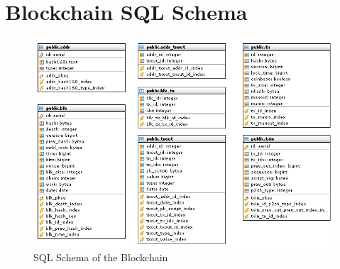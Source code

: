 \chapter{Blockchain SQL Schema} %
\label{AppendixA} %


\begin{figure}[ht]
\begin{center}
\includegraphics[width=\textwidth]{./Figures/SQL.png}
\caption{ SQL Schema of the Blockchain}
\label{fig:SQL}
\end{center}
\end{figure}

